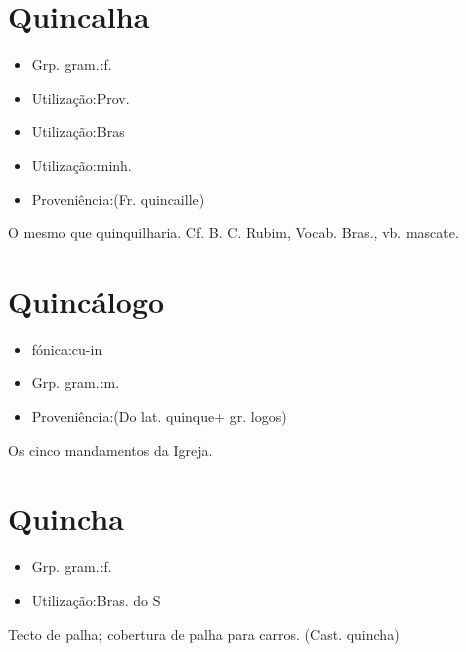 \section{Quincalha}
\begin{itemize}
\item {Grp. gram.:f.}
\end{itemize}
\begin{itemize}
\item {Utilização:Prov.}
\end{itemize}
\begin{itemize}
\item {Utilização:Bras}
\end{itemize}
\begin{itemize}
\item {Utilização:minh.}
\end{itemize}
\begin{itemize}
\item {Proveniência:(Fr. \textunderscore quincaille\textunderscore )}
\end{itemize}
O mesmo que \textunderscore quinquilharia\textunderscore . Cf. B. C. Rubim, \textunderscore Vocab. Bras.\textunderscore , vb. \textunderscore mascate\textunderscore .
\section{Quincálogo}
\begin{itemize}
\item {fónica:cu-in}
\end{itemize}
\begin{itemize}
\item {Grp. gram.:m.}
\end{itemize}
\begin{itemize}
\item {Proveniência:(Do lat. \textunderscore quinque\textunderscore  + gr. \textunderscore logos\textunderscore )}
\end{itemize}
Os cinco mandamentos da Igreja.
\section{Quincha}
\begin{itemize}
\item {Grp. gram.:f.}
\end{itemize}
\begin{itemize}
\item {Utilização:Bras. do S}
\end{itemize}
Tecto de palha; cobertura de palha para carros.
(Cast. \textunderscore quincha\textunderscore )
